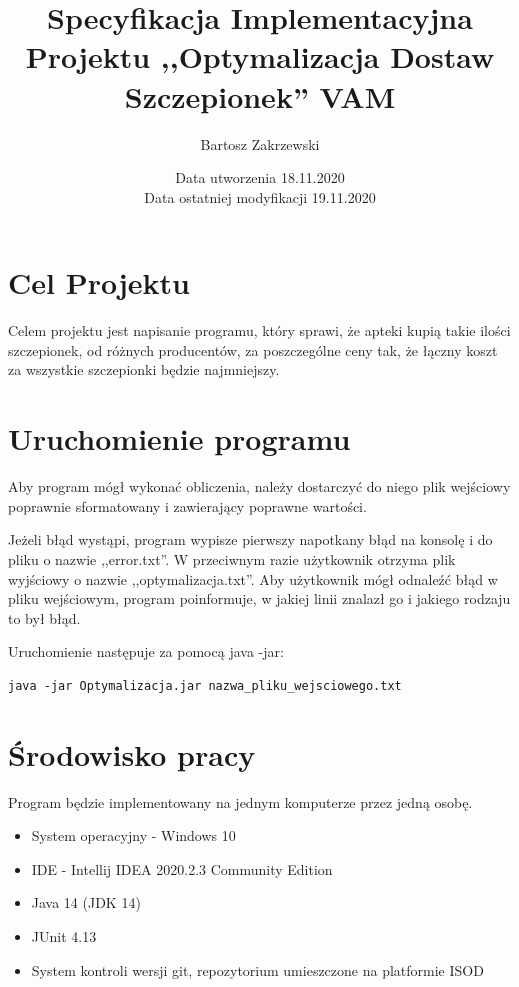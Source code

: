 \documentclass{article}
\title {Specyfikacja Implementacyjna Projektu ,,Optymalizacja Dostaw Szczepionek'' VAM}
\author{Bartosz Zakrzewski}
\date{Data utworzenia 18.11.2020 \\ Data ostatniej modyfikacji 19.11.2020}
\begin{document}
\maketitle
\thispagestyle{empty}

\clearpage
\tableofcontents
\thispagestyle{empty}

\clearpage

\section{Cel Projektu}
Celem projektu jest napisanie programu, który sprawi, że apteki kupią takie ilości szczepionek, od różnych producentów, za poszczególne ceny tak, że łączny koszt za wszystkie szczepionki będzie najmniejszy.

\section{Uruchomienie programu}

Aby program mógł wykonać obliczenia, należy dostarczyć do niego plik wejściowy poprawnie sformatowany i zawierający poprawne wartości.
\\

\par Jeżeli błąd wystąpi, program wypisze pierwszy napotkany błąd na konsolę i do pliku o nazwie ,,error.txt''. W przeciwnym razie użytkownik otrzyma plik wyjściowy o nazwie ,,optymalizacja.txt''.
Aby użytkownik mógł odnaleźć błąd w pliku wejściowym, program poinformuje, w jakiej linii znalazł go i jakiego rodzaju to był błąd.
\\ 
\par Uruchomienie następuje za pomocą java -jar:

\begin{lstlisting}
java -jar Optymalizacja.jar nazwa_pliku_wejsciowego.txt
\end{lstlisting}

\section{Środowisko pracy}
Program będzie implementowany na jednym komputerze przez jedną osobę.

\begin{itemize}
    \item System operacyjny - Windows 10
    \item IDE - Intellij IDEA 2020.2.3 Community Edition
    \item Java 14 (JDK 14)
    \item JUnit 4.13
    \item System kontroli wersji git, repozytorium umieszczone na platformie ISOD
\end{itemize}
\end{document}
